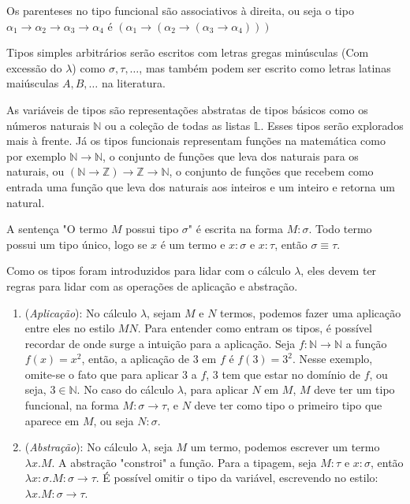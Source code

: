 \documentclass[../main.tex]{subfiles}
\begin{document}
Os parenteses no tipo funcional são associativos à direita, ou seja o tipo $\alpha_1 \to \alpha_2 \to \alpha_3 \to \alpha_4$ é $(\alpha_1 \to (\alpha_2 \to (\alpha_3 \to \alpha_4)))$

Tipos simples arbitrários serão escritos com letras gregas minúsculas (Com excessão do $\lambda$) como $\sigma, \tau, \dots$, mas também podem ser escrito como letras latinas maiúsculas $A, B, \dots$ na literatura.


As variáveis de tipos são representações abstratas de tipos básicos como os números naturais $\mathbb{N}$ ou a coleção de todas as listas $\mathbb{L}$. Esses tipos serão explorados mais à frente. Já os tipos funcionais representam funções na matemática como por exemplo $\mathbb{N} \to \mathbb{N}$, o conjunto de funções que leva dos naturais para os naturais, ou $(\mathbb{N} \to \mathbb{Z}) \to \mathbb{Z} \to \mathbb{N}$, o conjunto de funções que recebem como entrada uma função que leva dos naturais aos inteiros e um inteiro e retorna um natural.

A sentença "O termo $M$ possui tipo $\sigma$" é escrita na forma $M : \sigma$. Todo termo possui um tipo único, logo se $x$ é um termo e $x : \sigma$ e $x : \tau$, então $\sigma \equiv \tau$.

Como os tipos foram introduzidos para lidar com o cálculo $\lambda$, eles devem ter regras para lidar com as operações de aplicação e abstração.

\begin{enumerate}
    \item (\emph{Aplicação}): No cálculo $\lambda$, sejam $M$ e $N$ termos, podemos fazer uma aplicação entre eles no estilo $MN$. Para entender como entram os tipos, é possível recordar de onde surge a intuição para a aplicação. Seja $f : \mathbb{N} \to \mathbb{N}$ a função $f(x) = x^2$, então, a aplicação de $3$ em $f$ é $f(3) = 3^2$. Nesse exemplo, omite-se o fato que para aplicar $3$ a $f$, $3$ tem que estar no domínio de $f$, ou seja, $3 \in \mathbb{N}$. No caso do cálculo $\lambda$, para aplicar $N$ em $M$, $M$ deve ter um tipo funcional, na forma $M : \sigma \to \tau$, e $N$ deve ter como tipo o primeiro tipo que aparece em $M$, ou seja $N : \sigma$. 
    \item (\emph{Abstração}): No cálculo $\lambda$, seja $M$ um termo, podemos escrever um termo $\lambda x . M$. A abstração "constroi" a função. Para a tipagem, seja $M : \tau$ e $x : \sigma$, então $\lambda x : \sigma . M : \sigma \to \tau$. É possível omitir o tipo da variável, escrevendo no estilo: $\lambda x . M : \sigma \to \tau$.
\end{enumerate}
\end{document}
